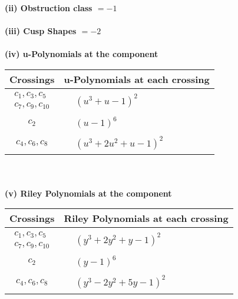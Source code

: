 \documentclass[1p]{elsarticle_modified}
\theoremstyle{definition}
\begin{document}
\flushleft \textbf{(ii) Obstruction class $= -1$}\\~\\
\flushleft \textbf{(iii) Cusp Shapes $= -2$}\\~\\
\newpage\renewcommand{\arraystretch}{1}
\flushleft \textbf{(iv) u-Polynomials at the component}\newline \\
\begin{tabular}{m{50pt}|m{274pt}}
Crossings & \hspace{64pt}u-Polynomials at each crossing \\
\hline $$\begin{aligned}c_{1},c_{3},c_{5}\\c_{7},c_{9},c_{10}\end{aligned}$$&$\begin{aligned}
&(u^3+u-1)^2
\end{aligned}$\\
\hline $$\begin{aligned}c_{2}\end{aligned}$$&$\begin{aligned}
&(u-1)^6
\end{aligned}$\\
\hline $$\begin{aligned}c_{4},c_{6},c_{8}\end{aligned}$$&$\begin{aligned}
&(u^3+2 u^2+u-1)^2
\end{aligned}$\\
\hline
\end{tabular}\\~\\
\newpage\renewcommand{\arraystretch}{1}
\flushleft \textbf{(v) Riley Polynomials at the component}\newline \\
\begin{tabular}{m{50pt}|m{274pt}}
Crossings & \hspace{64pt}Riley Polynomials at each crossing \\
\hline $$\begin{aligned}c_{1},c_{3},c_{5}\\c_{7},c_{9},c_{10}\end{aligned}$$&$\begin{aligned}
&(y^3+2 y^2+y-1)^2
\end{aligned}$\\
\hline $$\begin{aligned}c_{2}\end{aligned}$$&$\begin{aligned}
&(y-1)^6
\end{aligned}$\\
\hline $$\begin{aligned}c_{4},c_{6},c_{8}\end{aligned}$$&$\begin{aligned}
&(y^3-2 y^2+5 y-1)^2
\end{aligned}$\\
\hline
\end{tabular}\\~\\
\end{document}
